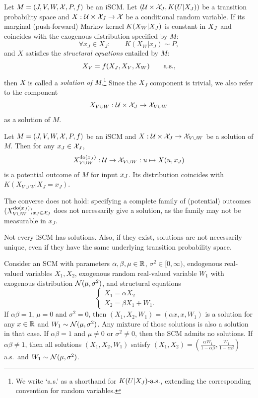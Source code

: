 \begin{Def}\label{def:scm_solutions}
  Let $M = \left ( J, V, W, \mathcal{X}, P, f \right )$ be an iSCM.
  Let $(\mathcal{U} \times \mathcal{X}_{J}, K(U|X_J))$ be a transition probability space and $X : \mathcal{U} \times \mathcal{X}_{J} \to \mathcal{X}$ be a conditional random variable.
  If its marginal (push-forward) Markov kernel $K(X_W | X_{J})$ is constant in $X_{J}$ and coincides with the exogenous distribution specified by $M$:
  $$\forall x_J \in X_J: \qquad K(X_W | x_J) \sim P,$$
  and $X$ satisfies the \emph{structural equations} entailed by $M$:
    \begin{equation}\label{eq:scm_structural_equations}
      X_{V} = f(X_{J}, X_{V}, X_{W}) \qquad \text{a.s.,}
    \end{equation}
  then $X$ is called a \emph{solution of $M$}.\footnote{We write `a.s.' as a shorthand for $K(U|X_J)\text{-a.s.}$, extending the corresponding convention for random variables.}
  Since the $X_J$ component is trivial, we also refer to the component 
  $$X_{V\cup W} : \mathcal{U} \times \mathcal{X}_{J} \to \mathcal{X}_{V \cup W}$$
  as a solution of $M$.
\end{Def}
\begin{Rem}\label{def:scm_potential_outcome}
  Let $M = \left ( J, V, W, \mathcal{X}, P, f \right )$ be an iSCM and $X : \mathcal{U} \times \mathcal{X}_{J} \to \mathcal{X}_{V\cup W}$ be a solution of $M$. 
  Then for any $x_{J} \in \mathcal{X}_{J}$, 
  $$X^{\operatorname{do}(x_{J})}_{V\cup W} : \mathcal{U} \to \mathcal{X}_{V\cup W} : u \mapsto X(u,x_{J})$$ 
  is a potential outcome of $M$ for input $x_{J}$.
  Its distribution coincides with $K(X_{V\cup W} | X_J=x_J)$.
\end{Rem}
The converse does not hold: specifying a complete family of (potential) outcomes $(X^{\operatorname{do}(x_J)}_{V\cup W})_{x_J \in \mathcal{X}_J}$ does not necessarily give a solution, as the family may not be measurable in $x_J$.

Not every iSCM has solutions. 
Also, if they exist, solutions are not necessarily unique, even if they have the same underlying transition probability space.
\begin{Eg}\label{eg:not_every_scm_has_solutions}
  Consider an SCM with parameters $\alpha,\beta,\mu \in \mathbb{R}$, $\sigma^2 \in [0,\infty)$, endogenous real-valued variables $X_1,X_2$, exogenous random real-valued variable $W_1$ with exogenous distribution $\mathcal{N}(\mu,\sigma^2)$,
and structural equations
$$\begin{cases}
  X_1 = \alpha X_2 & \\
  X_2 = \beta X_1 + W_1. &
\end{cases}$$
If $\alpha \beta = 1$, $\mu = 0$ and $\sigma^2=0$, then $(X_1,X_2,W_1) = (\alpha x,x,W_1)$ is a solution for any $x\in\mathbb{R}$ and $W_1 \sim \mathcal{N}(\mu,\sigma^2)$.
Any mixture of those solutions is also a solution in that case.
If $\alpha \beta = 1$ and $\mu \ne 0$ or $\sigma^2\ne 0$, then the SCM admits no solutions. 
If $\alpha \beta \ne 1$, then all solutions $(X_1,X_2,W_1)$ satisfy $(X_1,X_2) = (\frac{\alpha W_1}{1 - \alpha\beta},\frac{W_1}{1 - \alpha\beta})$ a.s.\ and $W_1 \sim \mathcal{N}(\mu,\sigma^2)$.
\end{Eg}

